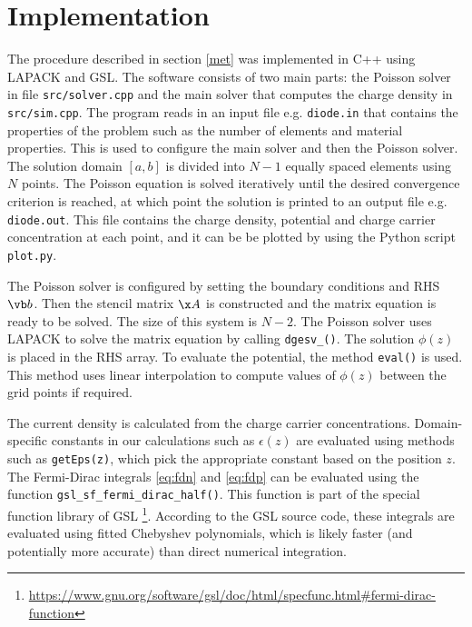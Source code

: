 \documentclass[10pt]{article}
\begin{document}
\section{Implementation}

The procedure described in section \ref{met} was implemented in C++ using LAPACK and GSL. The software consists of two main parts: the Poisson solver in file \verb|src/solver.cpp| and the main solver that computes the charge density in \verb|src/sim.cpp|. The program reads in an input file e.g. \verb|diode.in| that contains the properties of the problem such as the number of elements and material properties. This is used to configure the main solver and then the Poisson solver. The solution domain $[a, b]$ is divided into $N - 1$ equally spaced elements using $N$ points. The Poisson equation is solved iteratively until the desired convergence criterion is reached, at which point the solution is printed to an output file e.g. \verb|diode.out|. This file contains the charge density, potential and charge carrier concentration at each point, and it can be be plotted by using the Python script \verb|plot.py|.

The Poisson solver is configured by setting the boundary conditions and RHS $\vb b$. Then the stencil matrix $\x A$ is constructed and the matrix equation is ready to be solved. The size of this system is $N - 2$. The Poisson solver uses LAPACK to solve the matrix equation by calling \verb|dgesv_()|. The solution $\phi(z)$ is placed in the RHS array. To evaluate the potential, the method \verb|eval()| is used. This method uses linear interpolation to compute values of $\phi(z)$ between the grid points if required.

The current density is calculated from the charge carrier concentrations. Domain-specific constants in our calculations such as $\epsilon(z)$ are evaluated using methods such as \verb|getEps(z)|, which pick the appropriate constant based on the position $z$. The Fermi-Dirac integrals \ref{eq:fdn} and \ref{eq:fdp} can be evaluated using the function \verb|gsl_sf_fermi_dirac_half()|. This function is part of the special function library of GSL \footnote{\url{https://www.gnu.org/software/gsl/doc/html/specfunc.html\#fermi-dirac-function}}. According to the GSL source code, these integrals are evaluated using fitted Chebyshev polynomials, which is likely faster (and potentially more accurate) than direct numerical integration.

\end{document}

